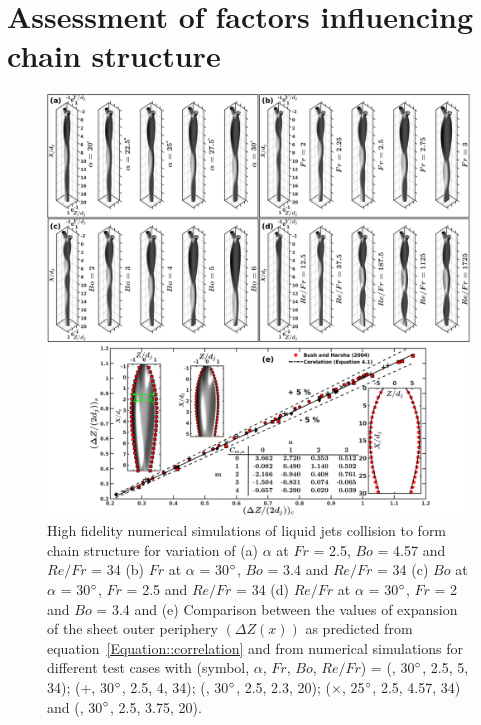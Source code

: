 \documentclass{jfm}
\begin{document}
\section{Assessment of factors influencing chain structure}
\begin{figure}
	\centering
	\includegraphics[width=\linewidth]{Figure6}
	\caption{High fidelity numerical simulations of liquid jets collision to form chain structure for variation of (a) $\alpha$ at $Fr$ = 2.5, $Bo$ = 4.57 and $Re/Fr$ = 34 (b) $Fr$ at $\alpha$ = 30$\degree$, $Bo$ = 3.4 and $Re/Fr$ = 34 (c) $Bo$ at $\alpha$ = 30$\degree$, $Fr$ = 2.5 and $Re/Fr$ = 34 (d)  $Re/Fr$ at $\alpha$ = 30$\degree$, $Fr$ = 2 and $Bo$ = 3.4 and (e) Comparison between the values of expansion of the sheet outer periphery $\left(\Delta Z(x)\right)$ as predicted from equation~\ref{Equation::correlation} and from numerical simulations for different test cases with (symbol, $\alpha$, $Fr$, $Bo$, $Re/Fr$) = (\protect\MarkerSquareRed, 30$\degree$, 2.5, 5, 34); (+, 30$\degree$, 2.5, 4, 34); (\protect \MarkerDiamondBlack, 30$\degree$, 2.5, 2.3, 20); ($\times$, 25$\degree$, 2.5, 4.57, 34) and (\protect \MarkerCircleRed, 30$\degree$, 2.5, 3.75, 20).}
	\label{Figure::phaseContours}%
\end{figure}
\end{document}
